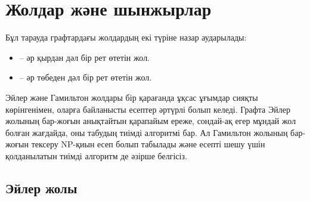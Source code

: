\chapter{Жолдар және шынжырлар}

Бұл тарауда графтардағы жолдардың екі түріне назар аударылады:
\begin{itemize}
\item {} -- әр қырдан дәл бір рет өтетін
жол.
\item {} -- әр төбеден
дәл бір рет өтетін жол.
\end{itemize}

Эйлер және Гамильтон жолдары бір қарағанда 
ұқсас ұғымдар сияқты көрінгенімен, оларға
байланысты есептер әртүрлі болып келеді.
Графта Эйлер жолының бар-жоғын анықтайтын
қарапайым ереже, сондай-ақ егер мұндай жол болған 
жағдайда, оны табудың тиімді алгоритмі бар.
Ал Гамильтон жолының бар-жоғын тексеру NP-қиын
есеп болып табылады және есепті шешу үшін қолданылатын тиімді 
алгоритм де әзірше белгісіз.

\section{Эйлер жолы}


